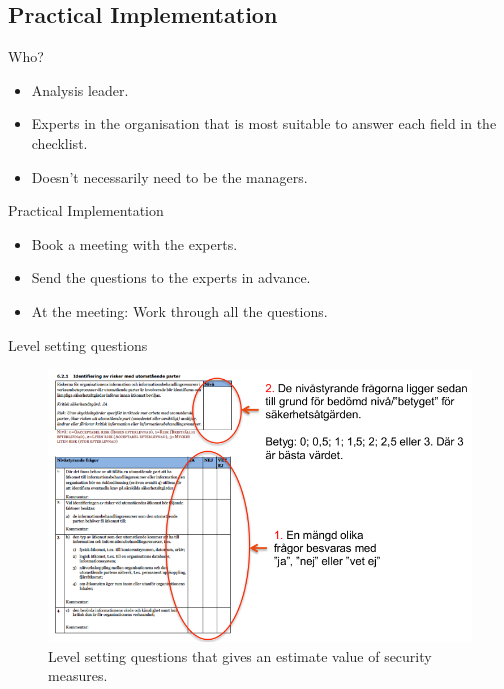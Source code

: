 \documentclass{beamer}
\begin{document}
\subsection{Practical Implementation}

\begin{frame}{Who?}
  \begin{itemize}
    \item Analysis leader.
    \item Experts in the organisation that is most suitable to answer each field
      in the checklist.
    \item Doesn't necessarily need to be the managers.
  \end{itemize}
\end{frame}

\begin{frame}{Practical Implementation}
  \begin{itemize}
    \item Book a meeting with the experts.
    \item Send the questions to the experts in advance.
    \item At the meeting: Work through all the questions.
  \end{itemize}
\end{frame}

\begin{frame}{Level setting questions}
  \begin{figure}
    \includegraphics[height=0.7\textheight]{gap-nivafragor.png}
    \caption{Level setting questions that gives an estimate value of security
      measures.}
  \end{figure}
\end{frame}
\end{document}
